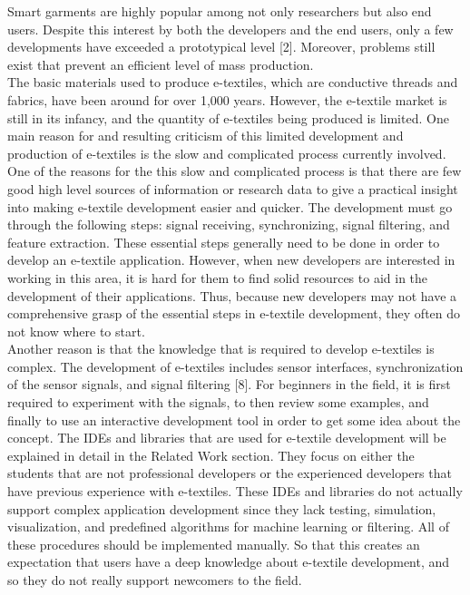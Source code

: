 	Smart garments are highly popular among not only researchers but also end users. Despite this interest by both the developers and the end users, only a few developments have exceeded a prototypical level [2]. Moreover, problems still exist that prevent an efficient level of mass production. 
	\\	
	
The basic materials used to produce e-textiles, which are conductive threads and fabrics, have been around for over 1,000 years. However, the e-textile market is still in its infancy, and the quantity of e-textiles being produced is limited. One main reason for and resulting criticism of this limited development and production of e-textiles is the slow and complicated process currently involved. 
\\
	
	
	One of the reasons for the this slow and complicated process is that there are few good high level sources of information or research data to give a practical insight into making e-textile development easier and quicker. The development must go through the following steps: signal receiving, synchronizing, signal filtering, and feature extraction. These essential steps generally need to be done in order to develop an e-textile application. However, when new developers are interested in working in this area, it is hard for them to find solid resources to aid in the development of their applications. Thus, because new developers may not have a comprehensive grasp of the essential steps in e-textile development, they often do not know where to start. 
	\\
	
	 Another reason is that the knowledge that is required to develop e-textiles is complex. The development of e-textiles includes sensor interfaces, synchronization of the sensor signals, and signal filtering [8]. For beginners in the field, it is first required to experiment with the signals, to then review some examples, and finally to use an interactive development tool in order to get some idea about the concept. The IDEs and libraries that are used for e-textile development will be explained in detail in the Related Work section. They focus on either the students that are not professional developers or the experienced developers that have previous experience with e-textiles. These IDEs and libraries do not actually support complex application development since they lack testing, simulation, visualization, and predefined algorithms for machine learning or filtering. All of these procedures should be implemented manually. So that this creates an expectation that users have a deep knowledge about e-textile development, and so they do not really support newcomers to the field.  \\	
	
